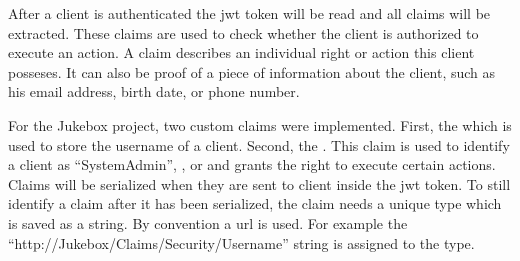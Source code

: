 

After a client is authenticated the \gls{jwt} token will be read and all claims will be extracted. These claims are used to check whether the client is authorized to execute an action. A claim describes an individual right or action this client posseses. It can also be proof of a piece of information about the client, such as his email address, birth date, or phone number.

For the Jukebox project, two custom claims were implemented. First, the  which is used to store the username of a client. Second, the . This claim is used to identify a client as \enquote{SystemAdmin}, , or  and grants the right to execute certain actions. Claims will be serialized when they are sent to client inside the \gls{jwt} token. To still identify a claim after it has been serialized, the claim needs a unique type which is saved as a string. By convention a \gls{url} is used. For example the \enquote{http://Jukebox/Claims/Security/Username} string is assigned to the  type. \cite{claimsBasedAuth}




